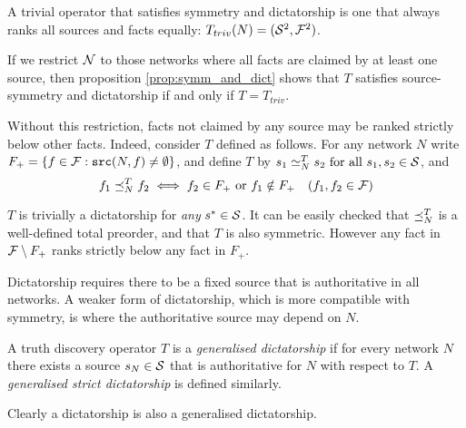 \documentclass[../main.tex]{subfiles}
\begin{document}
\begin{example}
A trivial operator that satisfies symmetry and dictatorship is one that always
ranks all sources and facts equally: $T_{triv}(N) = (\S^2, \F^2)$.

If we restrict $\N$ to those networks where all facts are claimed by
at least one source, then proposition \ref{prop:symm_and_dict} shows that $T$
satisfies source-symmetry and dictatorship if and only if $T=T_{triv}$.

Without this restriction, facts not claimed by any source may be ranked
strictly below other facts. Indeed, consider $T$ defined as follows. For any
network $N$ write $F_{+} = \{f \in \F : \src(N, f) \ne \emptyset \}$, and
define $T$ by $s_1 \seq_N^{T} s_2 \text{ for all } s_1, s_2 \in \S$, and
$$
    f_1 \fle_N^{T} f_2 \iff f_2 \in F_{+} \text{ or } f_1 \notin F_{+}
    \quad
    (f_1, f_2 \in \F)
$$

$T$ is trivially a dictatorship for \emph{any} $s^* \in \S$. It can be easily
checked that $\fle_N^T$ is a well-defined total preorder, and that $T$ is also
symmetric. However any fact in $\F \setminus F_+$ ranks strictly below any fact
in $F_+$.
\end{example}

Dictatorship requires there to be a fixed source that is authoritative
in all networks. A weaker form of dictatorship, which is more compatible with
symmetry, is where the authoritative source may depend on $N$.

\begin{definition}
\label{def:gen_dict}
A truth discovery operator $T$ is a \emph{generalised dictatorship} if for
every network $N$ there exists a source $s_N \in \S$ that is authoritative for
$N$ with respect to $T$. A \emph{generalised strict dictatorship} is defined
similarly.
\end{definition}

Clearly a dictatorship is also a generalised dictatorship.
\end{document}
